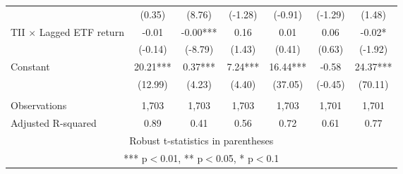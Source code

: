 \documentclass[]{article}
\begin{document}
\begin{tabular}{lcccccc}
 & (0.35) & (8.76) & (-1.28) & (-0.91) & (-1.29) & (1.48) \\
TII $\times$ Lagged ETF return & -0.01 & -0.00*** & 0.16 & 0.01 & 0.06 & -0.02* \\
 & (-0.14) & (-8.79) & (1.43) & (0.41) & (0.63) & (-1.92) \\
Constant & 20.21*** & 0.37*** & 7.24*** & 16.44*** & -0.58 & 24.37*** \\
 & (12.99) & (4.23) & (4.40) & (37.05) & (-0.45) & (70.11) \\
 &  &  &  &  &  &  \\
Observations & 1,703 & 1,703 & 1,703 & 1,703 & 1,701 & 1,701 \\
 Adjusted R-squared & 0.89 & 0.41 & 0.56 & 0.72 & 0.61 & 0.77 \\ \hline
\multicolumn{7}{c}{ Robust t-statistics in parentheses} \\
\multicolumn{7}{c}{ *** p$<$0.01, ** p$<$0.05, * p$<$0.1} \\
\end{tabular}
\end{document}
